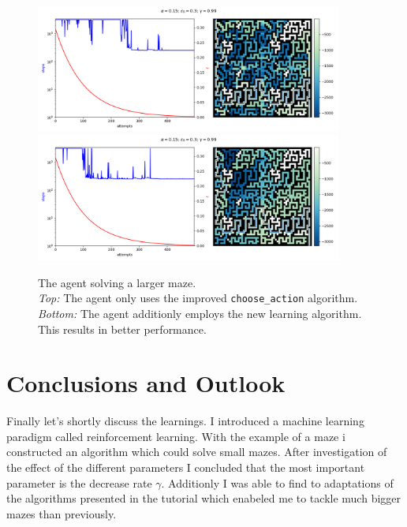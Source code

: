 \documentclass[12pt,a4paper]{scrartcl}
\begin{document}
\begin{figure}[htbp]
    \centering
    \includegraphics[width=0.9\textwidth]{algorithms/learn_choose2_very_very_big_mazeN500_lr0.15_er0.30_dr0.99000.png}
    \includegraphics[width=0.9\textwidth]{algorithms/learn2_choose2_very_very_big_mazeN500_lr0.15_er0.30_dr0.99000.png }
    \caption{The agent solving a larger maze. \\
    \textit{Top:} The agent only uses the improved \texttt{choose\_action}
    algorithm. \\
    \textit{Bottom:} The agent additionly employs the new learning algorithm.
    This results in better performance.
    }
    \label{fig:learn_comp}
\end{figure}

\FloatBarrier
\section{Conclusions and Outlook}
\label{sec:conclusions}

Finally let's shortly discuss the learnings.
I introduced a machine learning paradigm called reinforcement learning.
With the example of a maze i constructed an algorithm which could solve small
mazes. After investigation of the effect of the different parameters I concluded
that the most important parameter is the decrease rate $\gamma$. Additionly I
was able to find to adaptations of the algorithms presented in the tutorial
which enabeled me to tackle much bigger mazes than previously.
\end{document}
